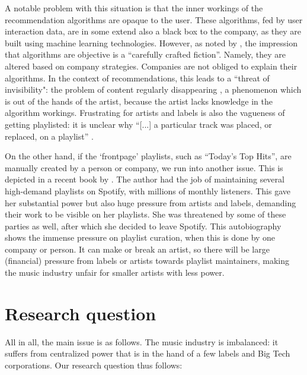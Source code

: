 A notable problem with this situation is that the inner workings of the recommendation algorithms are opaque to the user. These algorithms, fed by user interaction data, are in some extend also a black box to the company, as they are built using machine learning technologies. However, as noted by \citep{gillespie2014relevance}, the impression that algorithms are objective is a ``carefully crafted fiction''. Namely, they are altered based on company strategies. Companies are not obliged to explain their algorithms. In the context of recommendations, this leads to a ``threat of invisibility": the problem of content regularly disappearing \citep{bucher2018if}, a phenomenon which is out of the hands of the artist, because the artist lacks knowledge in the algorithm workings. Frustrating for artists and labels is also the vagueness of getting playlisted: it is unclear why ``[...] a particular track was placed, or replaced, on a playlist'' \citep{prey2020locating}. 

On the other hand, if the `frontpage' playlists, such as ``Today's Top Hits'', are manually created by a person or company, we run into another issue. This is depicted in a recent book by \cite{heuvelings2020}. The author had the job of maintaining several high-demand playlists on Spotify, with millions of monthly listeners. This gave her substantial power but also huge pressure from artists and labels, demanding their work to be visible on her playlists. She was threatened by some of these parties as well, after which she decided to leave Spotify. This autobiography shows the immense pressure on playlist curation, when this is done by one company or person. It can make or break an artist, so there will be large (financial) pressure from labels or artists towards playlist maintainers, making the music industry unfair for smaller artists with less power.

\section{Research question}
All in all, the main issue is as follows. The music industry is imbalanced: it suffers from centralized power that is in the hand of a few labels and Big Tech corporations. Our research question thus follows:

